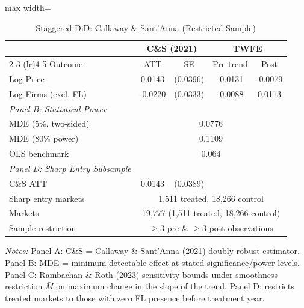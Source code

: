 \begin{table}[htbp]
\centering
\caption{Staggered DiD: Callaway \& Sant'Anna (Restricted Sample)}
\label{tab:did_revised}
\begin{adjustbox}{max width=\textwidth}
\begin{threeparttable}
\small
\begin{tabular}{lcccc}
\toprule
 & \multicolumn{2}{c}{C\&S (2021)} & \multicolumn{2}{c}{TWFE} \\
\cmidrule(lr){2-3} \cmidrule(lr){4-5}
Outcome & ATT & SE & Pre-trend & Post \\
\midrule
Log Price & 0.0143 & (0.0396) & -0.0131 & -0.0079 \\
Log Firms (excl. FL) & -0.0220 & (0.0333) & -0.0088 & 0.0113 \\
\midrule
\textit{Panel B: Statistical Power} & & & & \\
MDE (5\%, two-sided) & \multicolumn{4}{c}{0.0776} \\
MDE (80\% power) & \multicolumn{4}{c}{0.1109} \\
OLS benchmark & \multicolumn{4}{c}{0.064} \\
\midrule
\textit{Panel D: Sharp Entry Subsample} & & & & \\
C\&S ATT & 0.0143 & (0.0389) & & \\
Sharp entry markets & \multicolumn{4}{c}{1,511 treated, 18,266 control} \\
\midrule
Markets & \multicolumn{4}{c}{19,777 (1,511 treated, 18,266 control)} \\
Sample restriction & \multicolumn{4}{c}{$\geq$3 pre \& $\geq$3 post observations} \\
\bottomrule
\end{tabular}
\begin{tablenotes}
\small
\item \textit{Notes:} Panel A: C\&S = Callaway \& Sant'Anna (2021) doubly-robust estimator.
Panel B: MDE = minimum detectable effect at stated significance/power levels.
Panel C: Rambachan \& Roth (2023) sensitivity bounds under smoothness restriction $\bar{M}$
on maximum change in the slope of the trend.
Panel D: restricts treated markets to those with zero FL presence before treatment year.
\end{tablenotes}
\end{threeparttable}
\end{adjustbox}
\end{table}
